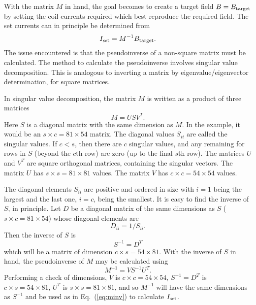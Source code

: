 \documentclass[preprint,12pt]{elsarticle}
\begin{document}
With the matrix $M$ in hand, the goal becomes to create a target field
$B=B_{\rm target}$ by setting the coil currents required which best
reproduce the required field.  The set currents can in principle be
determined from
\begin{equation}
  I_{\rm set}=M^{-1}B_{\rm target}.
  \label{eq:minv}
\end{equation}
The issue encountered is that the pseudoinverse of a non-square matrix
must be calculated.  The method to calculate the pseudoinverse
involves singular value decomposition.  This is analogous to inverting
a matrix by eigenvalue/eigenvector determination, for square matrices.

In singular value decomposition, the matrix $M$ is written as a
product of three matrices
\begin{equation}
  M=USV^T.
\end{equation}
Here $S$ is a diagonal matrix with the same dimension as $M$.  In the
example, it would be an $s\times c=81\times 54$ matrix.  The diagonal
values $S_{ii}$ are called the singular values.  If $c<s$, then there
are $c$ singular values, and any remaining for rows in $S$ (beyond the
$c$th row) are zero (up to the final $s$th row).  The matrices $U$ and
$V^T$ are square orthogonal matrices, containing the singular vectors.
The matrix $U$ has $s\times s=81\times 81$ values.  The matrix $V$ has
$c\times c=54\times 54$ values.

The diagonal elements $S_{ii}$ are positive and ordered in size with
$i=1$ being the largest and the last one, $i=c$, being the smallest.
It is easy to find the inverse of $S$, in principle.  Let $D$ be a
diagonal matrix of the same dimensions as $S$ ($s\times c=81\times
54$) whose diagonal elements are
\begin{equation}
  D_{ii}=1/S_{ii}.
\end{equation}
Then the inverse of $S$ is
\begin{equation}
  S^{-1}=D^T
\end{equation}
which will be a matrix of dimension $c\times s=54\times 81$.  With the
inverse of $S$ in hand, the pseudoinverse of $M$ may be calculated using
\begin{equation}
  M^{-1}=VS^{-1}U^T.
\end{equation}
Performing a check of dimensions, $V$ is $c\times c=54\times 54$,
$S^{-1}=D^T$ is $c\times s=54\times 81$, $U^T$ is $s\times s=81\times
81$, and so $M^{-1}$ will have the same dimensions as $S^{-1}$ and be
used as in Eq.~(\ref{eq:minv}) to calculate $I_{\rm set}$.
\end{document}
